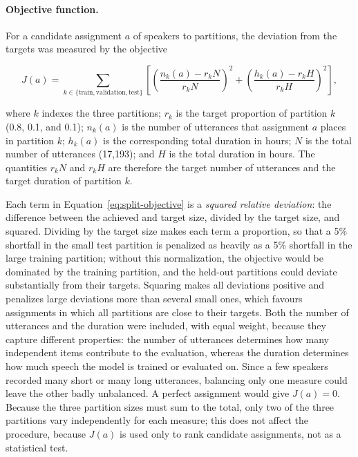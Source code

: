 \paragraph{Objective function.}
For a candidate assignment $a$ of speakers to partitions, the deviation from the
targets was measured by the objective

\begin{equation}
J(a) = \sum_{k \in \{\text{train}, \text{validation}, \text{test}\}} \left[ \left( \frac{n_k(a) - r_k N}{r_k N} \right)^2 + \left( \frac{h_k(a) - r_k H}{r_k H} \right)^2 \right],
\label{eq:split-objective}
\end{equation}

where $k$ indexes the three partitions; $r_k$ is the target proportion of
partition $k$ (0.8, 0.1, and 0.1); $n_k(a)$ is the number of utterances that
assignment $a$ places in partition $k$; $h_k(a)$ is the corresponding total
duration in hours; $N$ is the total number of utterances (17,193); and $H$ is the
total duration in hours. The quantities $r_k N$ and $r_k H$ are therefore the
target number of utterances and the target duration of partition $k$.

Each term in Equation~\eqref{eq:split-objective} is a \emph{squared relative
deviation}: the difference between the achieved and target size, divided by the
target size, and squared. Dividing by the target size makes each term a
proportion, so that a 5\% shortfall in the small test partition is penalized as
heavily as a 5\% shortfall in the large training partition; without this
normalization, the objective would be dominated by the training partition, and
the held-out partitions could deviate substantially from their targets. Squaring
makes all deviations positive and penalizes large deviations more than several
small ones, which favours assignments in which all partitions are close to their
targets. Both the number of utterances and the duration were included, with
equal weight, because they capture different properties: the number of utterances
determines how many independent items contribute to the evaluation, whereas the
duration determines how much speech the model is trained or evaluated on. Since a
few speakers recorded many short or many long utterances, balancing only one
measure could leave the other badly unbalanced. A perfect assignment would give
$J(a) = 0$. Because the three partition sizes must sum to the total, only two of
the three partitions vary independently for each measure; this does not affect
the procedure, because $J(a)$ is used only to rank candidate assignments, not as a
statistical test.

